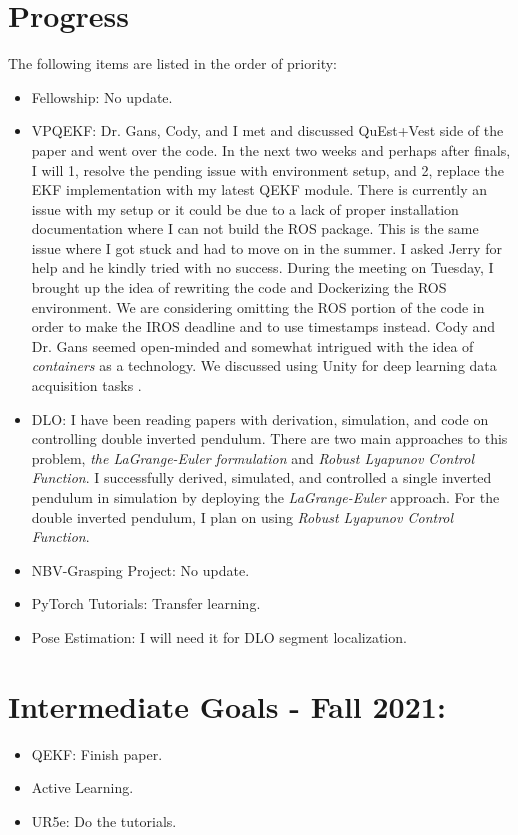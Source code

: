 \documentclass[11pt]{article}
\begin{document}
\section{Progress}
The following items are listed in the order of priority:
\begin{itemize}
      \item Fellowship: No update.
      \item VPQEKF: Dr. Gans, Cody, and I met and discussed QuEst+Vest
      side of the paper and went over the code. In the next two weeks and perhaps
      after finals, I will 1, resolve the pending issue with environment setup,
      and 2, replace the EKF implementation with my latest QEKF module.
      There is currently an issue with my setup or it could be due to a lack of
      proper installation documentation where I can not build the ROS package.
      This is the same
      issue where I got stuck and had to move on in the
      summer. I asked Jerry for help and he kindly tried with no success. During
      the meeting on Tuesday, I brought up the idea of rewriting the code and
      Dockerizing the ROS environment. We are considering omitting
      the ROS portion of the code in order to make the IROS deadline and
      to use timestamps instead.
      Cody and Dr. Gans
      seemed open-minded and somewhat intrigued with the idea of \emph{containers}
       as a technology.
      We discussed using Unity for deep learning data acquisition tasks \cite{quest}.


      \item DLO: I have been reading papers with derivation, simulation, and code
      on controlling double inverted pendulum. There are two main approaches
      to this problem, \emph{the LaGrange-Euler formulation} and \emph{Robust
      Lyapunov Control Function}. I successfully derived, simulated,
      and controlled a single inverted pendulum in simulation by deploying the
      \emph{LaGrange-Euler} approach. For the double inverted pendulum, I plan
      on using \emph{Robust Lyapunov Control Function}.

      \item NBV-Grasping Project: No update.
      \item PyTorch Tutorials: Transfer learning.
      \item Pose Estimation: I will need it for DLO segment localization.
\end{itemize}


\section{Intermediate Goals - Fall 2021:}
\begin{itemize}
      \item QEKF: Finish paper.
      \item Active Learning.
      \item UR5e: Do the tutorials.
\end{itemize}


\newpage


\end{document}
